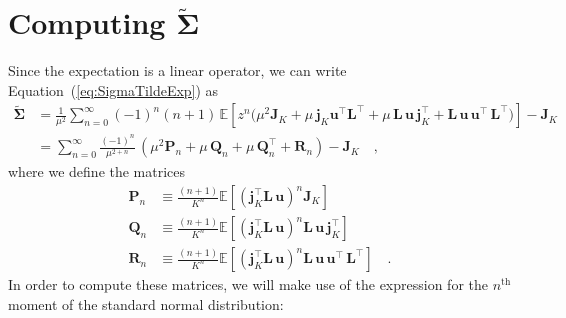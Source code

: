 \documentclass[modern]{aastex62}
\begin{document}
\clearpage

\appendix


\section{Computing $\tilde{\pmb{\Sigma}}$}
%
Since the expectation is a linear operator, we can write Equation~(\ref{eq:SigmaTildeExp})
as
%
\begin{align}
    \tilde{\pmb{\Sigma}}
     & =
    \frac{1}{\mu^2}
    \sum\limits_{n=0}^\infty
    (-1)^n (n + 1)
    \,
    \mathbb{E}\left[
        z^n
        \Bigg(
        \mu^2 \mathbf{J}_K
        +
        \mu \, \mathbf{j}_K\mathbf{u}^\top \mathbf{L}^\top
        +
        \mu \, \mathbf{L} \, \mathbf{u} \, \mathbf{j}_K^\top
        +
        \mathbf{L} \, \mathbf{u} \, \mathbf{u}^\top \, \mathbf{L}^\top
        \Bigg)
        \right]
    - \mathbf{J}_K
    \nonumber \\[0.5em]
     & =
    \sum\limits_{n=0}^\infty
    \frac{(-1)^n}{\mu^{2 + n}}
    \,
    \left(
    \mu^2 \mathbf{P}_n
    +
    \mu \, \mathbf{Q}_n
    +
    \mu \, \mathbf{Q}_n^\top
    +
    \mathbf{R}_n
    \right)
    - \mathbf{J}_K
    \quad,
\end{align}
%
where we define the matrices
%
\begin{align}
    \mathbf{P}_n & \equiv \frac{(n + 1)}{K^n}\mathbb{E}\left[ \left(\mathbf{j}_K^\top \mathbf{L} \, \mathbf{u}\right)^n \mathbf{J}_K \right]
    \nonumber                                                                                                                                                                                  \\[0.5em]
    \mathbf{Q}_n & \equiv \frac{(n + 1)}{K^n}\mathbb{E}\left[ \left(\mathbf{j}_K^\top \mathbf{L} \, \mathbf{u}\right)^n \mathbf{L} \, \mathbf{u} \, \mathbf{j}_K^\top \right]
    \nonumber                                                                                                                                                                                  \\[0.5em]
    \mathbf{R}_n & \equiv \frac{(n + 1)}{K^n}\mathbb{E}\left[ \left(\mathbf{j}_K^\top \mathbf{L} \, \mathbf{u}\right)^n \mathbf{L} \, \mathbf{u} \, \mathbf{u}^\top \, \mathbf{L}^\top \right]
    \quad.
\end{align}
%
In order to compute these matrices,
we will make use of the expression for the
$n^\mathrm{th}$ moment of the standard normal distribution:
\end{document}
